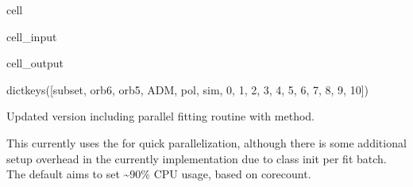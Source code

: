 \documentclass[letterpaper,table,10pt,english]{jupyterBook}
\begin{document}
\begin{sphinxuseclass}{cell}\begin{sphinxVerbatimInput}

\begin{sphinxuseclass}{cell_input}
\begin{sphinxVerbatim}[commandchars=\\\{\}]
\end{sphinxVerbatim}

\end{sphinxuseclass}\end{sphinxVerbatimInput}
\begin{sphinxVerbatimOutput}

\begin{sphinxuseclass}{cell_output}
\begin{sphinxVerbatim}[commandchars=\\\{\}]
dict\PYGZus{}keys([\PYGZsq{}subset\PYGZsq{}, \PYGZsq{}orb6\PYGZsq{}, \PYGZsq{}orb5\PYGZsq{}, \PYGZsq{}ADM\PYGZsq{}, \PYGZsq{}pol\PYGZsq{}, \PYGZsq{}sim\PYGZsq{}, 0, 1, 2, 3, 4, 5, 6, 7, 8, 9, 10])
\end{sphinxVerbatim}

\end{sphinxuseclass}\end{sphinxVerbatimOutput}

\end{sphinxuseclass}
\sphinxAtStartPar
{}

\sphinxAtStartPar
Updated version including parallel fitting routine with  method.

\sphinxAtStartPar
This currently uses the  for quick parallelization, although there is some additional setup overhead in the currently implementation due to class init per fit batch. The default aims to set \textasciitilde{}90\% CPU usage, based on core\sphinxhyphen{}count.
\end{document}
